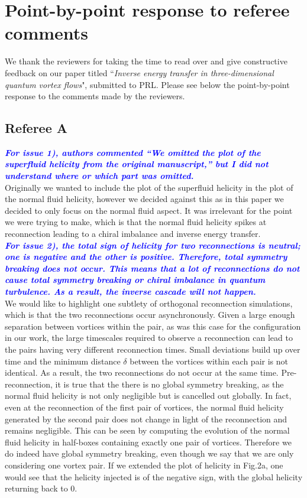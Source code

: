\documentclass[a4paper,10pt]{article}
\def\blue#1{\textcolor{blue}{#1}}
\def\refcomment#1{\textbf{\blue{\emph{#1}}}\\}
\begin{document}
\section*{\centering Point-by-point response to referee comments}

We thank the reviewers for taking the time to read over and give constructive feedback on our paper titled “\emph{Inverse energy transfer in three-dimensional quantum vortex flows}", submitted to PRL. Please see below the point-by-point response to the comments made by the reviewers.

\subsection*{Referee A}

\refcomment{For issue 1), authors
commented “We omitted the plot of the superfluid helicity from the
original manuscript,” but I did not understand where or which part was
omitted.}

Originally we wanted to include the plot of the superfluid helicity in the plot of the normal fluid helicity, however we decided against this as in this paper we decided to only focus on the normal fluid aspect. It was irrelevant for the point we were trying to make, which is that the normal fluid helicity spikes at reconnection leading to a chiral imbalance and inverse energy transfer.\\   

\refcomment{For issue 2), the total sign of helicity for two
reconnections is neutral; one is negative and the other is positive.
Therefore, total symmetry breaking does not occur. This means that a
lot of reconnections do not cause total symmetry breaking or chiral
imbalance in quantum turbulence. As a result, the inverse cascade will
not happen.}

We would like to highlight one subtlety of orthogonal reconnection simulations, which is that the two reconnections occur asynchronously. Given a large enough separation between vortices within the pair, as was this case for the configuration in our work, the large timescales required to observe a reconnection can lead to the pairs having very different reconnection times. Small deviations build up over time and the minimum distance $\delta$ between the vortices within each pair is not identical. As a result, the two reconnections do not occur at the same time. Pre-reconnection, it is true that the there is no global symmetry breaking, as the normal fluid helicity is not only negligible but is cancelled out globally. In fact, even at the reconnection of the first pair of vortices, the normal fluid helicity generated by the second pair does not change in light of the reconnection and remains negligible. This can be seen by computing the evolution of the normal fluid helicity in half-boxes containing exactly one pair of vortices. Therefore we do indeed have global symmetry breaking, even though we say that we are only considering one vortex pair. If we extended the plot of helicity in Fig.2a, one would see that the helicity injected is of the negative sign, with the global helicity returning back to 0. \\
\end{document}
